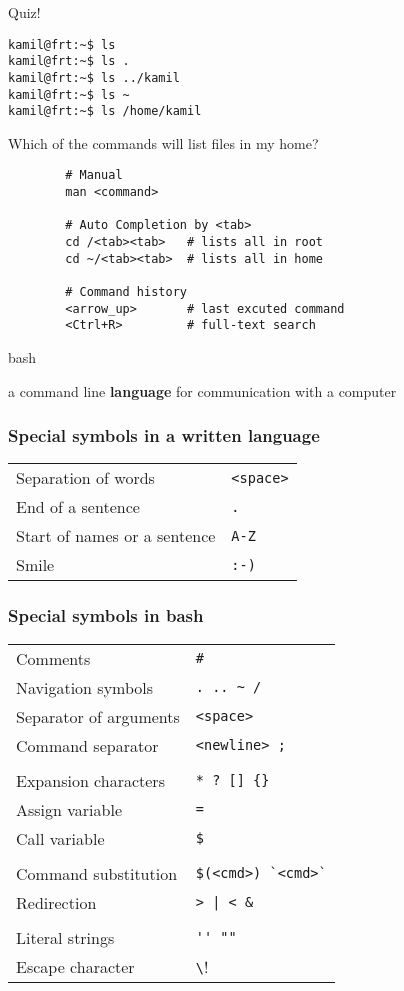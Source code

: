 \documentclass[xcolor=dvipsnames]{beamer}
\begin{document}
\begin{frame}[fragile]
Quiz!
\begin{verbatim}
kamil@frt:~$ ls
kamil@frt:~$ ls .
kamil@frt:~$ ls ../kamil
kamil@frt:~$ ls ~
kamil@frt:~$ ls /home/kamil
\end{verbatim}
Which of the commands will list files in my home?
\end{frame}

\begin{frame}[fragile]
	\Large
	\begin{verbatim}
		# Manual
		man <command>

		# Auto Completion by <tab>
		cd /<tab><tab>   # lists all in root
		cd ~/<tab><tab>  # lists all in home

		# Command history
		<arrow_up>       # last excuted command
		<Ctrl+R>         # full-text search
	\end{verbatim}
\end{frame}

\begin{frame}
	\Huge
	\begin{center}
		bash
	\end{center}
	\large
	a command line \huge \textbf{language} \large for communication with a computer
\end{frame}

\begin{frame}[fragile]
	\frametitle{Special symbols in a written language}
	\large
	\begin{tabular}{L{0.45\textwidth} L{0.5\textwidth}}
	Separation of words & \verb!<space>! \\
	End of a sentence & \verb!.! \\
	Start of names or a sentence & \verb!A-Z! \\
	Smile & \verb!:-)! \\
	\end{tabular}
\end{frame}

\begin{frame}[fragile]
	\frametitle{Special symbols in bash}
	\large
	\begin{tabular}{L{0.45\textwidth} L{0.5\textwidth}}
	Comments & \verb!#! \\
	Navigation symbols & \verb!. .. ~ /! \\
	Separator of arguments & \verb!<space>! \\
	Command separator & \verb!<newline> ;! \\
	& \\
	Expansion characters & \verb!* ? [] {}! \\
	Assign variable & \verb!=! \\
	Call variable & \verb!$! \\
	& \\
	Command substitution & \verb!$(<cmd>) `<cmd>`! \\
	Redirection & \verb!> | < &! \\
	& \\
	Literal strings & \verb!'' ""! \\
	Escape character & \verb!\! \\
	\end{tabular}
\end{frame}
\end{document}
